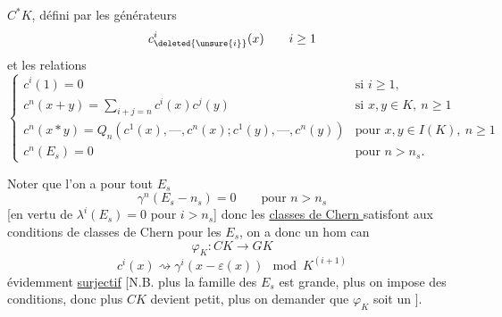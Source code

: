  $C^*K$, défini par les générateurs
\[
c_{\deleted{\unsure{i}}}^{i}(x)\qquad i\geq1
\]
et les relations
\[
\left\{\begin{array}{ll}
c^i(1)=0 & \text{si }i\geq1,\\
c^n(x+y)=\displaystyle\sum_{i+j=n}c^i(x)c^j(y)&\text{si }x,y\in K,\ n\geq1\\
c^n(x*y)=Q_n(c^1(x),\text{---},c^n(x);c^1(y),\text{---},c^n(y))&\text{pour }x,y\in I(K),\ n\geq1\\
c^n(E_s)=0&\text{pour }n>n_s.
\end{array}\right.
\]

Noter que l'on a pour tout $E_s$
\[
\gamma^n(E_s-n_s)=0\qquad\text{pour }n>n_s
\]
[en vertu de $\lambda^i(E_s)=0$ pour $i>n_s$] donc les \uline{classes de Chern } satisfont aux conditions de classes de Chern  pour les $E_s$, on a donc un hom can
\[
\varphi_K:CK\longrightarrow GK
\]
\[
c^i(x)\rightsquigarrow\gamma^i(x-\varepsilon(x))\mod K^{(i+1)}
\]
évidemment \uline{surjectif} [N.B. plus la famille des $E_s$ est grande, plus on impose des conditions, donc plus $CK$ devient petit, plus on  demander que $\varphi_K$ soit un ].



